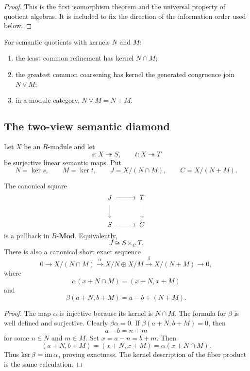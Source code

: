 \begin{proof}
This is the first isomorphism theorem and the universal property of quotient algebras.  It is included to fix the direction of the information order used below.
\end{proof}

\begin{corollary}
\label{cor:block17-combined-shared-semantics}
For semantic quotients with kernels \(N\) and \(M\):
\begin{enumerate}[label=\textup{(\roman*)}]
\item the least common refinement has kernel \(N\cap M\);
\item the greatest common coarsening has kernel the generated congruence join \(N\vee M\);
\item in a module category, \(N\vee M=N+M\).
\end{enumerate}
\end{corollary}

\subsection{The two-view semantic diamond}
\label{subsec:block17-semantic-diamond}

Let \(X\) be an \(R\)-module and let
\[
 s:X\twoheadrightarrow S,
 \qquad
 t:X\twoheadrightarrow T
\]
be surjective linear semantic maps.  Put
\[
 N=\ker s,
 \qquad
 M=\ker t,
 \qquad
 J=X/(N\cap M),
 \qquad
 C=X/(N+M).
\]

\begin{theorem}
\label{thm:block17-semantic-diamond}
The canonical square
\[
\begin{CD}
 J @>>> T\\
 @VVV @VVV\\
 S @>>> C
\end{CD}
\]
is a pullback in \(R\text{-}\mathbf{Mod}\).  Equivalently,
\[
 J\cong S\times_C T.
\]
There is also a canonical short exact sequence
\[
 0\longrightarrow X/(N\cap M)
 \xrightarrow{\alpha}
 X/N\oplus X/M
 \xrightarrow{\beta}
 X/(N+M)
 \longrightarrow0,
\]
where
\[
 \alpha(x+N\cap M)=(x+N,x+M)
\]
and
\[
 \beta(a+N,b+M)=a-b+(N+M).
\]
\end{theorem}

\begin{proof}
The map \(\alpha\) is injective because its kernel is \(N\cap M\).  The formula for \(\beta\) is well defined and surjective.  Clearly \(\beta\alpha=0\).  If \(\beta(a+N,b+M)=0\), then
\[
 a-b=n+m
\]
for some \(n\in N\) and \(m\in M\).  Set \(x=a-n=b+m\).  Then
\[
 (a+N,b+M)=(x+N,x+M)=\alpha(x+N\cap M).
\]
Thus \(\ker\beta=\operatorname{im}\alpha\), proving exactness.  The kernel description of the fiber product is the same calculation.
\end{proof}

